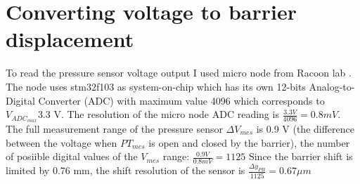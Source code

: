 \section{Converting voltage to barrier displacement}
\label{section:Converting_voltage_to_barrier_displacement}

To read the pressure sensor voltage output I used micro node from Racoon lab \cite{micro_node}. 
The node uses stm32f103 as system-on-chip which has its own 12-bits Analog-to-Digital Converter (ADC) with maximum value 4096 which corresponds to  $V_{ADC_{max}}$3.3 V.
The resolution of the micro node ADC reading is $\frac{3.3 V}{4096} = 0.8 mV$. 
The full measurement range of the pressure sensor $\Delta V_{mes}$ is 0.9 V (the difference between the voltage when $PT_{mes}$ is open and closed by the barrier), the number of posiible digital values of the $V_{mes}$ range: $\frac{0.9 V}{0.8 m V} = 1125$ 
Since the barrier shift is limited by 0.76 mm, the shift resolution of the sensor is $\frac{\Delta y_{PB}}{1125} = 0.67 \mu m$
